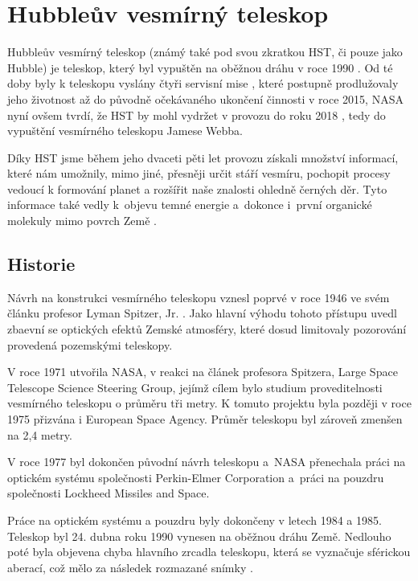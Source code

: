 \documentclass[a4paper,11pt]{article}
\begin{document}
\section{Hubbleův vesmírný teleskop}
Hubbleův vesmírný teleskop (známý také pod svou zkratkou HST, či pouze jako Hubble) je teleskop, který byl vypuštěn na oběžnou dráhu v roce 1990 \cite{nasaHubbleChronology}. Od té doby byly k teleskopu vyslány čtyři servisní mise \cite{hubbleSiteServicingMissions}, které postupně prodlužovaly jeho životnost až do původně očekávaného ukončení činnosti v roce 2015, NASA nyní ovšem tvrdí, že HST by mohl vydržet v provozu do roku 2018 \cite{hubbleUntil2018}, tedy do vypuštění vesmírného teleskopu Jamese Webba.

Díky HST jsme během jeho dvaceti pěti let provozu získali množství informací, které nám umožnily, mimo jiné, přesněji určit stáří vesmíru, pochopit procesy vedoucí k formování planet a rozšířit naše znalosti ohledně černých děr. Tyto informace také vedly k~objevu temné energie a~dokonce i~první organické molekuly mimo povrch Země \cite{nasaHubbleAccomplishments}.

\subsection{Historie}

Návrh na konstrukci vesmírného teleskopu vznesl poprvé v roce 1946 ve svém článku profesor Lyman Spitzer, Jr. \cite{LymanSpitzer1990131}. Jako hlavní výhodu tohoto přístupu uvedl zbaevní se optických efektů Zemské atmosféry, které dosud limitovaly pozorování provedená pozemskými teleskopy.

V roce 1971 utvořila NASA, v reakci na článek profesora Spitzera,  Large Space Telescope Science Steering Group, jejímž cílem bylo studium proveditelnosti vesmírného teleskopu o průměru tři metry. K tomuto projektu byla později v roce 1975 přizvána i European Space Agency. Průměr teleskopu byl zároveň zmenšen na 2,4 metry. 

V roce 1977 byl dokončen původní návrh teleskopu a~NASA přenechala práci na optickém systému společnosti Perkin-Elmer Corporation a~práci na pouzdru společnosti Lockheed Missiles and Space.

Práce na optickém systému a pouzdru byly dokončeny v letech 1984 a 1985.
Teleskop byl 24. dubna roku 1990 vynesen na oběžnou dráhu Země. Nedlouho poté byla objevena chyba hlavního zrcadla teleskopu, která se vyznačuje sférickou aberací, což mělo za následek rozmazané snímky \cite{nasaHubbleChronology}.
\end{document}
